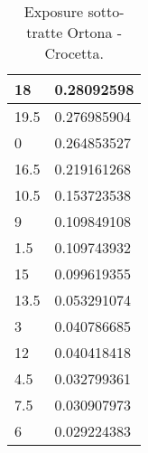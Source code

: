 \begin{table}[H]
\begin{tabular}{|l|l|}
		\rowcolor[HTML]{F8FF00} 
		18                                                        & 0.28092598                                                     \\ \hline
		\rowcolor[HTML]{F8FF00} 
		19.5                                                      & 0.276985904                                                    \\ \hline
		\rowcolor[HTML]{F8FF00} 
		0                                                         & 0.264853527                                                    \\ \hline
		\rowcolor[HTML]{F8FF00} 
		16.5                                                      & 0.219161268                                                    \\ \hline
		\rowcolor[HTML]{32CB00} 
		10.5                                                      & 0.153723538                                                    \\ \hline
		\rowcolor[HTML]{32CB00} 
		9                                                         & 0.109849108                                                    \\ \hline
		\rowcolor[HTML]{32CB00} 
		1.5                                                       & 0.109743932                                                    \\ \hline
		\rowcolor[HTML]{32CB00} 
		15                                                        & 0.099619355                                                    \\ \hline
		\rowcolor[HTML]{32CB00} 
		13.5                                                      & 0.053291074                                                    \\ \hline
		\rowcolor[HTML]{32CB00} 
		3                                                         & 0.040786685                                                    \\ \hline
		\rowcolor[HTML]{32CB00} 
		12                                                        & 0.040418418                                                    \\ \hline
		\rowcolor[HTML]{32CB00} 
		4.5                                                       & 0.032799361                                                    \\ \hline
		\rowcolor[HTML]{32CB00} 
		7.5                                                       & 0.030907973                                                    \\ \hline
		\rowcolor[HTML]{32CB00} 
		6                                                         & 0.029224383                                                    \\ \hline
	\end{tabular}
	\caption{Exposure sotto-tratte Ortona - Crocetta.}
	\label{exposure_ortona_crocetta}
\end{table}

